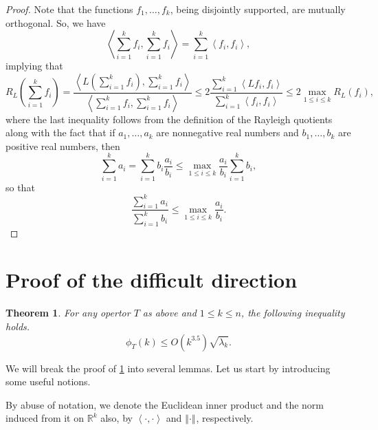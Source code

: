 \documentclass[12pt,a4paper,bold]{thesis}
\newtheorem{thm}{Theorem}[chapter]
\theoremstyle{definition}
\newcommand*{\ip}[2]{\left\langle #1 , #2 \right\rangle}
\newcommand*{\norm}[2][]{\left\Vert #2 \right\Vert_{#1}}
\begin{document}
\begin{proof}
    Note that the functions $f_1, \dots, f_k$, being disjointly supported, 
    are mutually orthogonal. So, we have
    \begin{equation*}
        \ip{\sum_{i=1}^{k} f_i}{\sum_{i=1}^{k} f_i} = \sum_{i=1}^{k} \ip{f_i}{f_i},
    \end{equation*}
    implying that
    \begin{equation*}
        R_L \left(\sum_{i=1}^{k} f_i\right) = \frac{\ip{L\left(\sum_{i=1}^{k} f_i\right)}
        {\sum_{i=1}^{k} f_i}}{\ip{\sum_{i=1}^{k} f_i}{\sum_{i=1}^{k} f_i}}
        \leq 2 \frac{\sum_{i=1}^{k} \ip{Lf_i}{f_i}}{\sum_{i=1}^{k} \ip{f_i}{f_i}}
        \leq 2 \max_{1 \leq i \leq k} R_L(f_i),
    \end{equation*}
    where the last inequality follows from the definition of the Rayleigh quotients 
    along with the fact that if $a_1, \dots, a_k$ are nonnegative real numbers 
    and $b_1, \dots, b_k$ are positive real numbers, then
    \begin{equation*}
        \sum_{i=1}^{k} a_i = \sum_{i=1}^{k} b_i \frac{a_i}{b_i} 
        \leq \max_{1 \leq i \leq k} \frac{a_i}{b_i} \sum_{i=1}^{k} b_i,
    \end{equation*}
    so that
    \begin{equation*}
        \frac{\sum_{i=1}^{k} a_i}{\sum_{i=1}^{k} b_i} 
        \leq \max_{1 \leq i \leq k} \frac{a_i}{b_i}.
    \end{equation*}
\end{proof}

\section{Proof of the difficult direction}

\begin{thm} \label{thm:cheeger-ineq}
    For any opertor $T$ as above and $1 \leq k \leq n$, the following inequality holds.
    \begin{equation*}
        \phi_T(k) \leq O(k^{3.5}) \sqrt{\lambda_k}.
    \end{equation*}
\end{thm}

We will break the proof of \cref{thm:cheeger-ineq} into several lemmas. 
Let us start by introducing some useful notions.

By abuse of notation, we denote the Euclidean inner product and the norm induced 
from it on $\mathbb{R}^k$ also, by $\ip{\cdot}{\cdot}$ and $\norm{\cdot}$, respectively.
\end{document}
